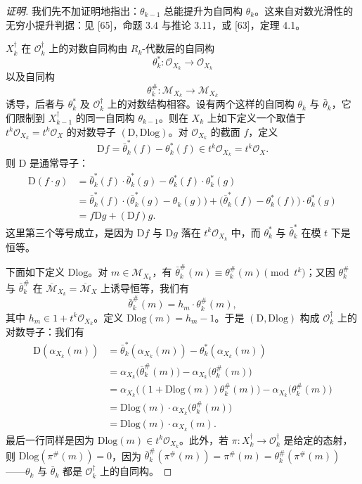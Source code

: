 \begin{proof}[证明]
我们先不加证明地指出：$\theta_{k-1}$ 总能提升为自同构 $\theta_k$。这来自对数光滑性的无穷小提升判据：见 [65]，命题 3.4 与推论 3.11，或 [63]，定理 4.1。

$X_k^{\dagger}$ 在 $\mathcal{O}_k^{\dagger}$ 上的对数自同构由 $R_k$-代数层的自同构
\[
  \theta_k^{*}:\mathcal{O}_{X_k}\to\mathcal{O}_{X_k}
\]
以及自同构
\[
  \theta_k^{\#}:\mathcal{M}_{X_k}\to\mathcal{M}_{X_k}
\]
诱导，后者与 $\theta_k^{*}$ 及 $\mathcal{O}_k^{\dagger}$ 上的对数结构相容。设有两个这样的自同构 $\theta_k$ 与 $\bar\theta_k$，它们限制到 $X_{k-1}^{\dagger}$ 的同一自同构 $\theta_{k-1}$。则在 $X_k$ 上如下定义一个取值于 $t^k\mathcal{O}_{X_k}=t^k\mathcal{O}_X$ 的对数导子 $(\mathrm{D},\mathrm{Dlog})$。对 $\mathcal{O}_{X_k}$ 的截面 $f$，定义
\[
  \mathrm{D}f=\bar\theta_k^{*}(f)-\theta_k^{*}(f)\in t^k\mathcal{O}_{X_k}=t^k\mathcal{O}_X.
\]
则 $\mathrm{D}$ 是通常导子：
\begin{align*}
  \mathrm{D}(f\cdot g)
  &=\bar\theta_k^{*}(f)\cdot\bar\theta_k^{*}(g)-\theta_k^{*}(f)\cdot\theta_k^{*}(g)\\
  &=\bar\theta_k^{*}(f)\cdot\bigl(\bar\theta_k^{*}(g)-\theta_k(g)\bigr)
    +\bigl(\bar\theta_k^{*}(f)-\theta_k^{*}(f)\bigr)\cdot\theta_k^{*}(g)\\
  &=f\mathrm{D}g+(\mathrm{D}f)g.
\end{align*}
这里第三个等号成立，是因为 $\mathrm{D}f$ 与 $\mathrm{D}g$ 落在 $t^k\mathcal{O}_{X_k}$ 中，而 $\theta_k^{*}$ 与 $\bar\theta_k^{*}$ 在模 $t$ 下是恒等。

下面如下定义 $\mathrm{Dlog}$。对 $m\in\mathcal{M}_{X_k}$，有 $\bar\theta_k^{\#}(m)\equiv\theta_k^{\#}(m)\pmod{t^k}$；又因 $\theta_k^{\#}$ 与 $\bar\theta_k^{\#}$ 在 $\overline{\mathcal{M}}_{X_k}=\overline{\mathcal{M}}_X$ 上诱导恒等，我们有
\[
  \bar\theta_k^{\#}(m)=h_m\cdot\theta_k^{\#}(m),
\]
其中 $h_m\in1+t^k\mathcal{O}_{X_k}$。定义 $\mathrm{Dlog}(m)=h_m-1$。于是 $(\mathrm{D},\mathrm{Dlog})$ 构成 $\mathcal{O}_k^{\dagger}$ 上的对数导子：我们有
\begin{align*}
  \mathrm{D}(\alpha_{X_k}(m))
  &=\bar\theta_k^{*}(\alpha_{X_k}(m))-\theta_k^{*}(\alpha_{X_k}(m))\\
  &=\alpha_{X_k}\bigl(\bar\theta_k^{\#}(m)\bigr)-\alpha_{X_k}\bigl(\theta_k^{\#}(m)\bigr)\\
  &=\alpha_{X_k}\bigl((1+\mathrm{Dlog}(m))\theta_k^{\#}(m)\bigr)-\alpha_{X_k}\bigl(\theta_k^{\#}(m)\bigr)\\
  &=\mathrm{Dlog}(m)\cdot\alpha_{X_k}\bigl(\theta_k^{\#}(m)\bigr)\\
  &=\mathrm{Dlog}(m)\cdot\alpha_{X_k}(m).
\end{align*}
最后一行同样是因为 $\mathrm{Dlog}(m)\in t^k\mathcal{O}_{X_k}$。此外，若 $\pi:X_k^{\dagger}\to\mathcal{O}_k^{\dagger}$ 是给定的态射，则 $\mathrm{Dlog}(\pi^{\#}(m))=0$，因为 $\bar\theta_k^{\#}(\pi^{\#}(m))=\pi^{\#}(m)=\theta_k^{\#}(\pi^{\#}(m))$——$\theta_k$ 与 $\bar\theta_k$ 都是 $\mathcal{O}_k^{\dagger}$ 上的自同构。


\end{proof}
